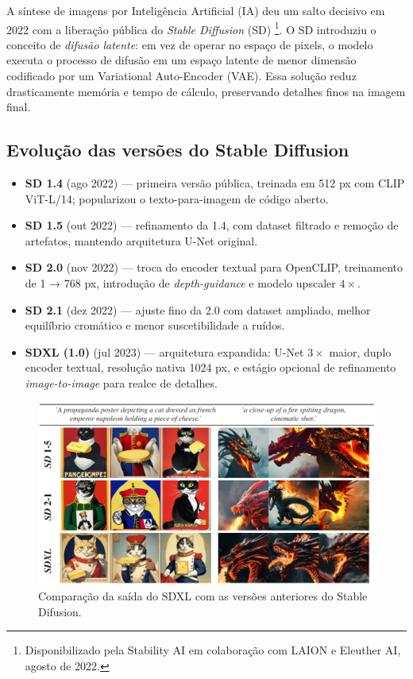 \documentclass[12pt, %
openright, 
oneside, %
a4paper,    %
brazil]{facom-ufu-abntex2}
\begin{document}
A síntese de imagens por Inteligência Artificial (IA) deu um salto decisivo em 2022 com a liberação pública do \textit{Stable Diffusion} (SD) \cite{rombach2022highresolutionimagesynthesislatent}\footnote{Disponibilizado pela Stability AI em colaboração com LAION e Eleuther AI, agosto de 2022.}. O SD introduziu o conceito de \emph{difusão latente}: em vez de operar no espaço de pixels, o modelo executa o processo de difusão em um espaço latente de menor dimensão codificado por um Variational Auto-Encoder (VAE). Essa solução reduz drasticamente memória e tempo de cálculo, preservando detalhes finos na imagem final.

\subsection*{Evolução das versões do Stable Diffusion}

\begin{itemize}
  \item \textbf{SD 1.4} (ago 2022) — primeira versão pública, treinada em 512 px com CLIP ViT-L/14; popularizou o texto-para-imagem de código aberto.  
  \item \textbf{SD 1.5} (out 2022) — refinamento da 1.4, com dataset filtrado e remoção de artefatos, mantendo arquitetura U-Net original.  
  \item \textbf{SD 2.0} (nov 2022) — troca do encoder textual para OpenCLIP, treinamento de 1 → 768 px, introdução de \emph{depth-guidance} e modelo upscaler \(4\times\).  
  \item \textbf{SD 2.1} (dez 2022) — ajuste fino da 2.0 com dataset ampliado, melhor equilíbrio cromático e menor suscetibilidade a ruídos.  
  \item \textbf{SDXL (1.0)} (jul 2023) — arquitetura expandida: U-Net \(3\times\) maior, duplo encoder textual, resolução nativa 1024 px, e estágio opcional de refinamento \emph{image-to-image} para realce de detalhes. \cite{podell2023sdxlimprovinglatentdiffusion}
\end{itemize}

\begin{figure}[H]
    \centering
	\includegraphics[width=0.85\linewidth]{figuras/comparison-sd-1.png}
	\caption[Comparação de versões do Stable Difusion]{Comparação da saída do SDXL com as versões anteriores do Stable Difusion.}
	\label{fig:comparisonSd1}
\end{figure}
\end{document}
